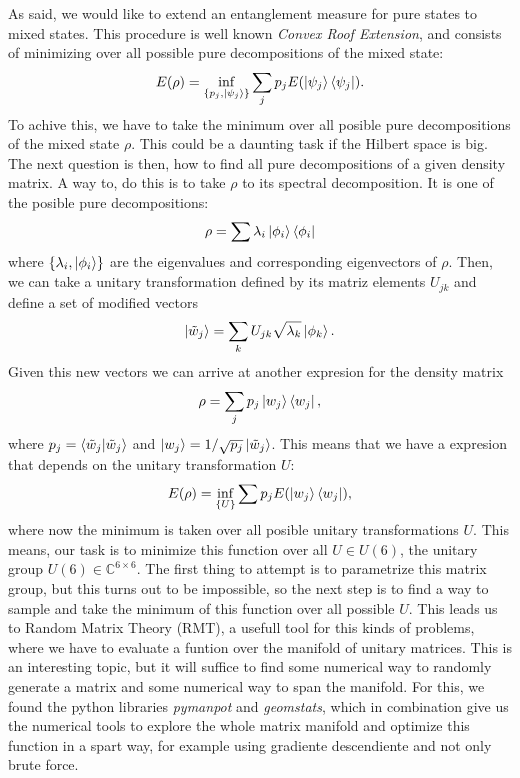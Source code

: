 As said, we would like to extend an entanglement measure for pure states to mixed states. This procedure is well known \textit{Convex Roof Extension}, and consists of minimizing over all possible pure decompositions of the mixed state:
\begin{equation}
    E(\rho)=\inf_{\{p_j,\ket{\psi_j}\}}\sum_{j} p_j E(\ket{\psi_j}\bra{\psi_j}).
\end{equation}
To achive this, we have to take the minimum over all posible pure decompositions of the mixed state $\rho$. This could be a daunting task if the Hilbert space is big. The next question is then, how to find all pure decompositions of a given density matrix. A way to, do this is to take $\rho$ to its spectral decomposition. It is one of the posible pure decompositions:
\begin{equation}
    \rho=\sum\lambda_i\ket{\phi_i}\bra{\phi_i}
\end{equation}
where $\{\lambda_i,\ket{\phi_i}\}$ are the eigenvalues and corresponding eigenvectors of $\rho$. Then, we can take a unitary transformation defined by its matriz elements $U_{jk}$ and define a set of modified vectors
\begin{equation}
    \ket{\tilde w_j}=\sum_k U_{jk}\sqrt{\lambda_k}\ket{\phi_k}.
\end{equation}
Given this new vectors we can arrive at another expresion for the density matrix
\begin{equation}
    \rho=\sum_j p_j \ket{w_j}\bra{w_j},
\end{equation}
where $p_j=\braket{\tilde w_j}{\tilde w_j}$ and $\ket{w_j}=1/\sqrt{p_j}\ket{\tilde w_j}$. This means that we have a expresion that depends on the unitary transformation $U$:
\begin{equation}
    E(\rho)=\inf_{\{U\}} \sum p_j E(\ket{w_j}\bra{w_j}),
\end{equation}
where now the minimum is taken over all posible unitary transformations $U$. This means, our task is to minimize this function over all $U\in U(6)$, the unitary group $U(6)\in \mathbb{C}^{6\times6}$. The first thing to attempt is to parametrize this matrix group, but this turns out to be impossible, so the next step is to find a way to sample and take the minimum of this function over all possible $U$. This leads us to Random Matrix Theory (RMT), a usefull tool for this kinds of problems, where we have to evaluate a funtion over the manifold of unitary matrices. This is an interesting topic, but it will suffice to find some numerical way to randomly generate a matrix and some numerical way to span the manifold. For this, we found the python libraries \textit{pymanpot} \cite{JMLR:v17:16-177} and \textit{geomstats}, which in combination give us the numerical tools to explore the whole matrix manifold and optimize this function in a spart way, for example using gradiente descendiente and not only brute force. 

